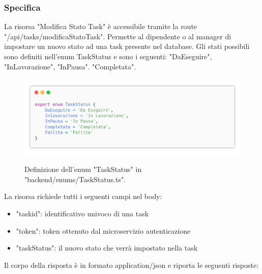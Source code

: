 \documentclass{report}
\begin{document}
\subsubsection*{Specifica}

La risorsa "Modifica Stato Task" è accessibile tramite la route "/api/tasks/modificaStatoTask". Permette al dipendente o al manager di impostare un nuovo stato ad una task presente nel database. Gli stati possibili sono definiti nell'enum TaskStatus e sono i seguenti: "DaEseguire", "InLavorazione", "InPausa". "Completata".

\begin{figure}[H]
	\centering\includegraphics[width=1\textwidth]{images/code_enum_taskStatus.png}

	Definizione dell'enum "TaskStatus" in "backend/enums/TaskStatus.ts".
\end{figure}

La risorsa richiede tutti i seguenti campi nel body:
\begin{itemize}
	\item "taskid": identificativo univoco di una task
	\item "token": token ottenuto dal microservizio autenticazione
	\item "taskStatus": il nuovo stato che verrà impostato nella task
\end{itemize}

Il corpo della risposta è in formato application/json e riporta le seguenti risposte:
\end{document}
